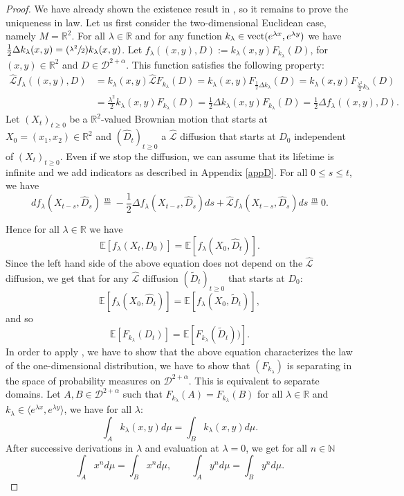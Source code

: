 \documentclass[JEP,XML,SOM,Unicode,NoFloatCountersInSection,published]{cedram}
\newcommand{\Psfrac}[2]{(\sfrac{#1}{#2})}
\theoremstyle{plain}
\theoremstyle{definition}
\newcommand{\EE}{{\mathbb E}}
\newcommand{\SL}{{\mathscr L}}
\let\a\alpha
\let\D\Delta
\newcommand{\cD}{\mathcal{D}}
\begin{document}
\begin{proof}
We have already shown the existence result in \cite{zbMATH07470497}, so it remains to prove the uniqueness in law.
Let us first consider the two-dimensional Euclidean case, namely $M = \mathbb{R}^2 $. For all $ \lambda \in \mathbb{R}$	 and for any function $k_{\lambda} \in {\rm vect} ( e^{\lambda x},e^{\lambda y} ) $ we have $ \frac12 \D k_{\lambda}(x,y)= \Psfrac{\lambda^2}{2}k_{\lambda}(x,y)$. Let $f_{\lambda} ((x,y),D):= k_{\lambda}(x,y) F_{k_{\lambda}}(D) $, for $(x,y) \in \mathbb{R}^2$ and $ D \in \cD^{2+\alpha} $. This function satisfies the following property:
\begin{align*}
\widehat{\SL} f_{\lambda}((x,y),D) & = k_{\lambda}(x,y) \widehat{\SL} F_{k_{\lambda}}(D) = k_{\lambda}(x,y) F_{\frac12 \D k_{\lambda}}(D)= k_{\lambda}(x,y) F_{\frac{\lambda^2}{2} k_{\lambda}}(D) \\
&= \frac{\lambda^2}{2} k_{\lambda}(x,y) F_{k_{\lambda}}(D) = \frac12 \D k_{\lambda}( x,y) F_{k_{\lambda}}(D)= \frac12 \D f_{\lambda}((x,y),D).
\end{align*}
Let $ (X_t)_{t \ge 0}$ be a $\mathbb{R}^2$-valued Brownian motion that starts at $X_0= (x_1,x_2) \in \mathbb{R}^2$ and $(\hat{D}_t)_{t \ge 0}$ a $\widehat{\SL} $ diffusion that starts at $D_0$ independent of $(X_t)_{t \ge 0}$.
{Even if we stop the diffusion, we can assume that its lifetime is infinite and we add indicators as described in Appendix \ref{appD}.}
For all $ 0 \le s \le t $, we have
\[
df_{\lambda}(X_{t-s}, \hat{D}_s) \overset{m} {=} - \frac{1}{2} \D f_{\lambda}(X_{t-s},\hat{D}_s)ds + \widehat{\SL} f_{\lambda} (X_{t-s},\hat{D}_s)ds \overset{m} {=} 0.
\]

Hence for all $\lambda \in \mathbb{R} $ we have
\begin{equation}\label{passe-passe}
\EE[f_{\lambda}(X_{t}, D_0) ] = \EE[f_{\lambda}(X_{0}, \hat{D}_t) ].
\end{equation}
Since the left hand side of the above equation does not depend on the $\widehat{\SL} $ diffusion, we get that for any $\widehat{\SL} $ diffusion $(\tilde{D}_t)_{t \ge 0}$ that starts at $D_0$:
\[
\EE[f_{\lambda}(X_{0}, \hat{D}_t) ] = \EE[f_{\lambda}(X_{0}, \tilde{D}_t) ],
\]
and so
\[
\EE[ F_{k_{\lambda}}(D_{t})] = \EE[ F_{k_{\lambda}}( \tilde{D}_{t}))].
\]
In order to apply \cite[Th.\,4.2]{MR838085}, we have to show that the above equation characterizes the law of the one-dimensional distribution, \ie we have to show that $ ( F_{k_{\lambda}}) $ is separating in the space of probability measures on $\cD^{2+\a} $. This is equivalent to separate domains.
Let $ A, B \in \cD^{2+\a}$ such that $ F_{k_{\lambda}}(A)= F_{k_{\lambda}}(B) $ for all $\lambda \in \mathbb{R} $ and $k_{\lambda} \in \langle e^{\lambda x},e^{\lambda y} \rangle $, we have for all $ \lambda$:
\[
\int_A k_{\lambda}(x,y) d\mu = \int_B k_{\lambda}(x,y) d\mu.
\]
After successive derivations in $ \lambda$ and evaluation at $\lambda =0 $, we get for all $n \in \mathbb{N}$
\[
\int_A x^n d\mu = \int_B x^n d\mu,\qquad
\int_A y^n d\mu = \int_B y^n d\mu.
\]


\end{proof}
\end{document}
